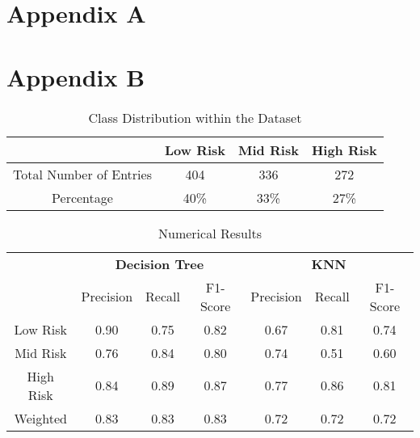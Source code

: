 \clearpage
\pagestyle{plain}
\section*{Appendix A}

\newpage
\section*{Appendix B}
\begin{table}[h]
    \centering
    \renewcommand{\arraystretch}{1.5}
    \begin{tabular}{cccc}
        & \textbf{Low Risk} & \textbf{Mid Risk} & \textbf{High Risk} \\
        \hline
        Total Number of Entries &  404 & 336 & 272 \\    
        \hline
        Percentage & 40\% & 33\% & 27\%\\
        \hline
    \end{tabular}
    \caption{Class Distribution within the Dataset}
    \label{tab:risk_entries}
\end{table}

\begin{table}[h]
    \centering
    \renewcommand{\arraystretch}{1.5}
    \begin{tabular}{cccc|ccc}
        & \multicolumn{3}{c}{\textbf{Decision Tree}} & \multicolumn{3}{c}{\textbf{KNN}} \\
        \cmidrule(lr){2-4} \cmidrule(lr){5-7}
                & Precision & Recall & F1-Score & Precision & Recall & F1-Score \\
        \hline
        Low Risk &  0.90 & 0.75 & 0.82          & 0.67 & 0.81&0.74 \\
        \hline
        Mid Risk &  0.76 & 0.84 & 0.80          & 0.74& 0.51& 0.60\\
        \hline
        High Risk & 0.84 & 0.89 & 0.87          & 0.77& 0.86&0.81 \\
        \hline
        Weighted & 0.83 & 0.83 & 0.83           & 0.72 & 0.72 & 0.72 \\
        \hline
    \end{tabular}
    \caption{Numerical Results}
    \label{tab:numercial}
\end{table}
